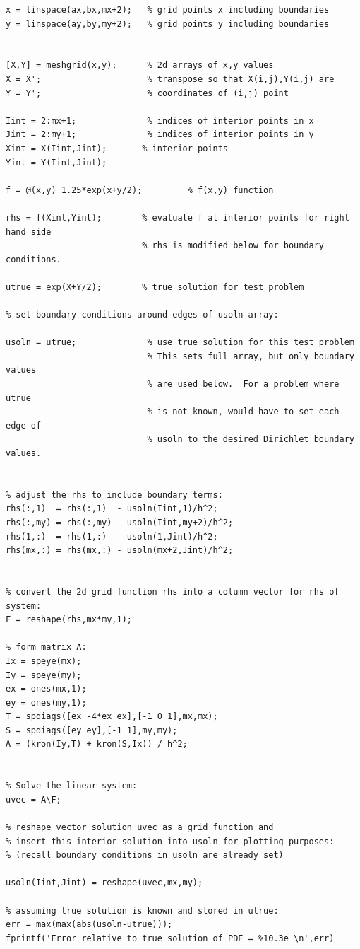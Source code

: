 \documentclass[11pt,twoside,openany]{memoir}
\begin{document}
\begin{solution}
\begin{lstlisting}[style=MatlabEditorGrey]
x = linspace(ax,bx,mx+2);   % grid points x including boundaries
y = linspace(ay,by,my+2);   % grid points y including boundaries


[X,Y] = meshgrid(x,y);      % 2d arrays of x,y values
X = X';                     % transpose so that X(i,j),Y(i,j) are
Y = Y';                     % coordinates of (i,j) point

Iint = 2:mx+1;              % indices of interior points in x
Jint = 2:my+1;              % indices of interior points in y
Xint = X(Iint,Jint);       % interior points
Yint = Y(Iint,Jint);

f = @(x,y) 1.25*exp(x+y/2);         % f(x,y) function

rhs = f(Xint,Yint);        % evaluate f at interior points for right hand side
                           % rhs is modified below for boundary conditions.

utrue = exp(X+Y/2);        % true solution for test problem

% set boundary conditions around edges of usoln array:

usoln = utrue;              % use true solution for this test problem
                            % This sets full array, but only boundary values
                            % are used below.  For a problem where utrue
                            % is not known, would have to set each edge of
                            % usoln to the desired Dirichlet boundary values.


% adjust the rhs to include boundary terms:
rhs(:,1)  = rhs(:,1)  - usoln(Iint,1)/h^2;
rhs(:,my) = rhs(:,my) - usoln(Iint,my+2)/h^2;
rhs(1,:)  = rhs(1,:)  - usoln(1,Jint)/h^2;
rhs(mx,:) = rhs(mx,:) - usoln(mx+2,Jint)/h^2;


% convert the 2d grid function rhs into a column vector for rhs of system:
F = reshape(rhs,mx*my,1);

% form matrix A:
Ix = speye(mx);
Iy = speye(my);
ex = ones(mx,1);
ey = ones(my,1);
T = spdiags([ex -4*ex ex],[-1 0 1],mx,mx);
S = spdiags([ey ey],[-1 1],my,my);
A = (kron(Iy,T) + kron(S,Ix)) / h^2;


% Solve the linear system:
uvec = A\F;  

% reshape vector solution uvec as a grid function and 
% insert this interior solution into usoln for plotting purposes:
% (recall boundary conditions in usoln are already set) 

usoln(Iint,Jint) = reshape(uvec,mx,my);

% assuming true solution is known and stored in utrue:
err = max(max(abs(usoln-utrue)));   
fprintf('Error relative to true solution of PDE = %10.3e \n',err)


\end{lstlisting}
\end{solution}
\end{document}
